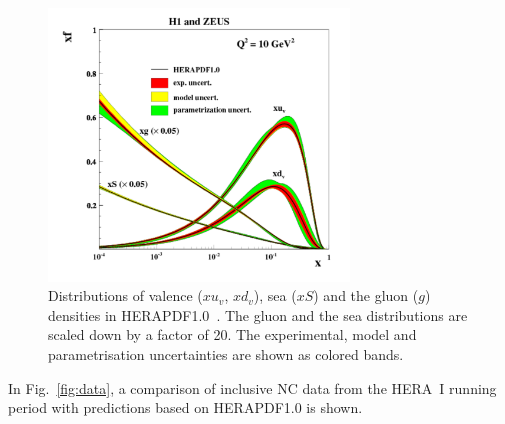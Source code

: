 \begin{description}
\begin{figure}[!ht]
   \centering
   \includegraphics[width=8cm]{hera1.pdf}
   \caption{Distributions of valence ($xu_v$, $xd_v$), sea ($xS$) and the gluon ($g$) densities in HERAPDF1.0~\cite{h1zeus:2009wt}. 
       The gluon and the sea distributions are scaled down by a factor of 20.
       The experimental, model and parametrisation uncertainties are shown as colored bands.}
 \label{fig:hera1}
\end{figure}
In Fig.~\ref{fig:data}, a comparison of inclusive NC data from the HERA~I running period with predictions based on HERAPDF1.0 is shown. 


\end{description}
